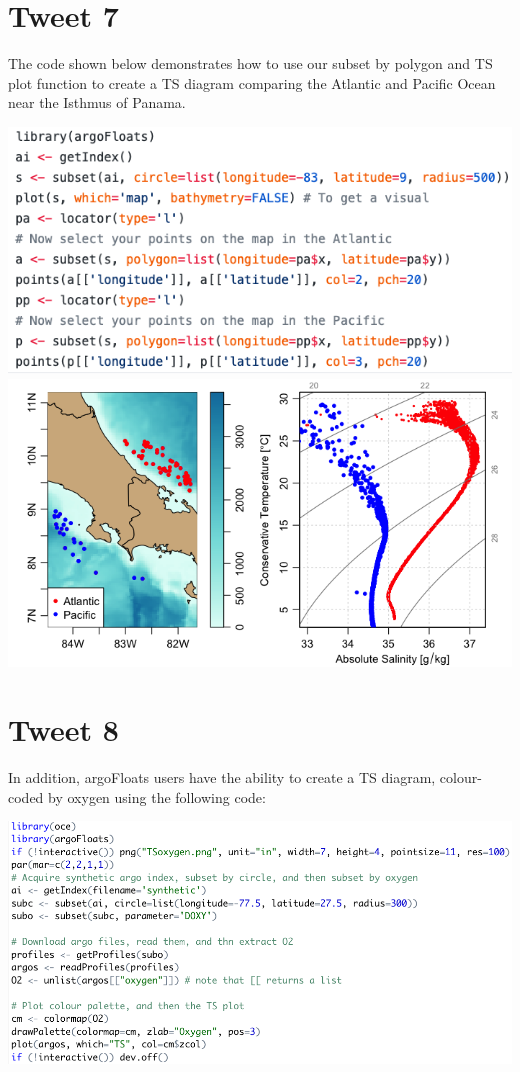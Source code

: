 \documentclass[
]{article}
\begin{document}
\hypertarget{tweet-7}{%
\section{Tweet 7}\label{tweet-7}}

The code shown below demonstrates how to use our subset by polygon and
TS plot function to create a TS diagram comparing the Atlantic and
Pacific Ocean near the Isthmus of Panama.

\includegraphics{../18_tweets/polygonCode.png}
\includegraphics{../18_tweets/TSpanama.png}

\hypertarget{tweet-8}{%
\section{Tweet 8}\label{tweet-8}}

In addition, argoFloats users have the ability to create a TS diagram,
colour-coded by oxygen using the following code:

\includegraphics{../18_tweets/TSoxygenCode.png}
\end{document}
